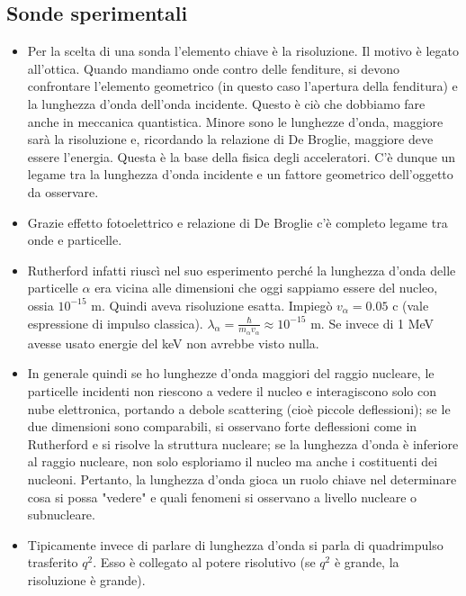 \subsection{Sonde sperimentali}
\begin{itemize}
    \item Per la scelta di una sonda l'elemento chiave è la risoluzione. Il motivo è legato all'ottica. Quando mandiamo onde contro delle fenditure, si devono confrontare l'elemento geometrico (in questo caso l'apertura della fenditura) e la lunghezza d'onda dell'onda incidente. Questo è ciò che dobbiamo fare anche in meccanica quantistica. Minore sono le lunghezze d'onda, maggiore sarà la risoluzione e, ricordando la relazione di De Broglie, maggiore deve essere l'energia. Questa è la base della fisica degli acceleratori. C'è dunque un legame tra la lunghezza d'onda incidente e un fattore geometrico dell'oggetto da osservare.
    \item Grazie effetto fotoelettrico e relazione di De Broglie c'è completo legame tra onde e particelle. 
    \item Rutherford infatti riuscì nel suo esperimento perché la lunghezza d'onda delle particelle $\alpha$ era vicina alle dimensioni che oggi sappiamo essere del nucleo, ossia $10^{-15}$ m. Quindi aveva risoluzione esatta. Impiegò $v_\alpha=0.05$ c (vale espressione di impulso classica). $\lambda_\alpha=\frac\hbar{m_\alpha v_\alpha}\approx 10^{-15}$ m. Se invece di 1 MeV avesse usato energie del keV non avrebbe visto nulla. 
    \item In generale quindi se ho lunghezze d'onda maggiori del raggio nucleare, le particelle incidenti non riescono a vedere il nucleo e interagiscono solo con nube elettronica, portando a debole scattering (cioè piccole deflessioni); se le due dimensioni sono comparabili, si osservano forte deflessioni come in Rutherford e si risolve la struttura nucleare; se la lunghezza d'onda è inferiore al raggio nucleare, non solo esploriamo il nucleo ma anche i costituenti dei nucleoni. Pertanto, la lunghezza d'onda gioca un ruolo chiave nel determinare cosa si possa "vedere" e quali fenomeni si osservano a livello nucleare o subnucleare.
    \item Tipicamente invece di parlare di lunghezza d'onda si parla di quadrimpulso trasferito $q^2$. Esso è collegato al potere risolutivo (se $q^2$ è grande, la risoluzione è grande).
\end{itemize}
